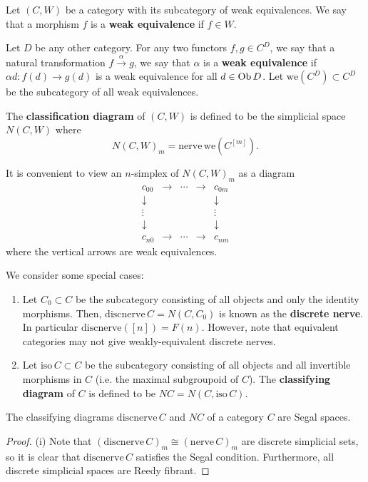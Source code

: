 \begin{refsection}
\begin{defin}
Let $(C,W)$ be a category with its subcategory of weak equivalences. We say that a morphism $f$ is a \textbf{weak equivalence} if $f\in W$.

Let $D$ be any other category. For any two functors $f,g\in C^D$, we say that a natural transformation $f\xrightarrow{\alpha}g$, we say that $\alpha$ is a \textbf{weak equivalence} if $\alpha d \colon f(d) \to g(d)$ is a weak equivalence for all $d\in\operatorname{Ob} D$. Let $\mathrm{we}(C^D)\subset C^D$ be the subcategory of all weak equivalences.

The \textbf{classification diagram} of $(C,W)$ is defined to be the simplicial space $N(C,W)$ where
\[
N(C,W)_m=\mathrm{nerve}\,\mathrm{we}(C^{[m]}).
\]
\end{defin}
It is convenient to view an $n$-simplex of $N(C,W)_m$ as a diagram
\[
\begin{matrix} c_{00}&\to&\cdots&\to&c_{0m}\\\downarrow&&&&\downarrow\\\vdots&&&&\vdots\\\downarrow&&&&\downarrow\\c_{n0}&\to&\cdots&\to&c_{nm}
\end{matrix}
\]
where the vertical arrows are weak equivalences.

We consider some special cases:
\begin{eg}\label{nerveeg}
\begin{enumerate}
\item Let $C_0\subset C$ be the subcategory consisting of all objects and only the identity morphisms. Then, $\mathrm{discnerve}\,C=N(C,C_0)$ is known as the \textbf{discrete nerve}. In particular $\mathrm{discnerve}([n])=F(n)$. However, note that equivalent categories may not give weakly-equivalent discrete nerves.

\item Let $\mathrm{iso}\,C\subset C$ be the subcategory consisting of all objects and all invertible morphisms in $C$ (i.e. the maximal subgroupoid of $C$). The \textbf{classifying diagram} of $C$ is defined to be $NC=N(C,\mathrm{iso}\,C)$.
\end{enumerate}
\end{eg}

\begin{prop}
The classifying diagrams $\mathrm{discnerve}\,C$ and $NC$ of a category $C$ are Segal spaces.
\end{prop}
\begin{proof}
(i) Note that $(\mathrm{discnerve}\,C)_m\cong(\mathrm{nerve}\,C)_m$ are discrete simplicial sets, so it is clear that $\mathrm{discnerve}\,C$ satisfies the Segal condition. Furthermore, all discrete simplicial spaces are Reedy fibrant.


\end{proof}
\end{refsection}
